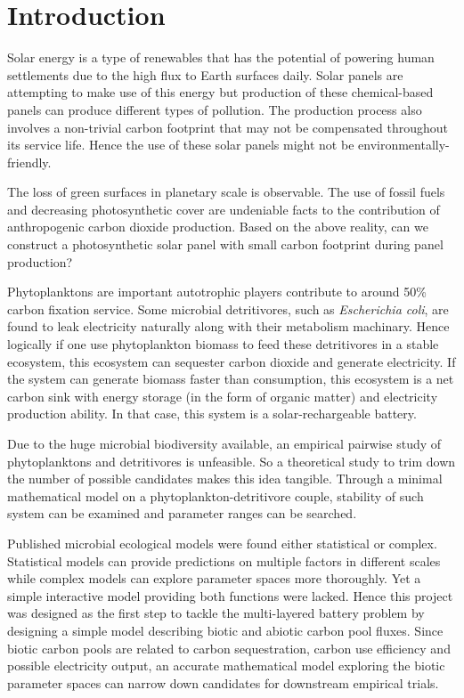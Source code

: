 \documentclass[../thesis.tex]{subfiles} %
\begin{document}
\section{Introduction}

Solar energy is a type of renewables that has the potential of powering human settlements due to the high flux to Earth surfaces daily.  Solar panels are attempting to make use of this energy but production of these chemical-based panels can produce different types of pollution.  The production process also involves a non-trivial carbon footprint that may not be compensated throughout its service life.  Hence the use of these solar panels might not be environmentally-friendly.

The loss of green surfaces in planetary scale is observable.  The use of fossil fuels and decreasing photosynthetic cover are undeniable facts to the contribution of anthropogenic carbon dioxide production.  Based on the above reality, can we construct a photosynthetic solar panel with small carbon footprint during panel production?

Phytoplanktons are important autotrophic players contribute to around 50\% carbon fixation service.  Some microbial detritivores, such as \textit{Escherichia coli}, are found to leak electricity naturally along with their metabolism machinary.  Hence logically if one use phytoplankton biomass to feed these detritivores in a stable ecosystem, this ecosystem can sequester carbon dioxide and generate electricity.  If the system can generate biomass faster than consumption, this ecosystem is a net carbon sink with energy storage (in the form of organic matter) and electricity production ability.  In that case, this system is a solar-rechargeable battery.

Due to the huge microbial biodiversity available, an empirical pairwise study of phytoplanktons and detritivores is unfeasible.  So a theoretical study to trim down the number of possible candidates makes this idea tangible.  Through a minimal mathematical model on a phytoplankton-detritivore couple, stability of such system can be examined and parameter ranges can be searched.

Published microbial ecological models were found either statistical or complex.  Statistical models can provide predictions on multiple factors in different scales while complex models can explore parameter spaces more thoroughly.  Yet a simple interactive model providing both functions were lacked.  Hence this project was designed as the first step to tackle the multi-layered battery problem by designing a simple model describing biotic and abiotic carbon pool fluxes.  Since biotic carbon pools are related to carbon sequestration, carbon use efficiency and possible electricity output, an accurate mathematical model exploring the biotic parameter spaces can narrow down candidates for downstream empirical trials.
\end{document}
